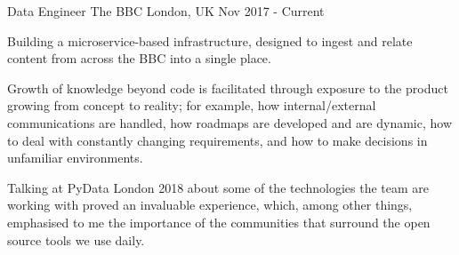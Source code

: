 \begin{cventries}
    \cventry
        {Data Engineer}
        {The BBC}
        {London, UK}
        {Nov 2017 - Current}
        {
            \begin{cvitems}
                \item{Building a microservice-based infrastructure, designed to ingest and relate content from across the BBC into a single place.}
                \item{Growth of knowledge beyond code is facilitated through exposure to the product growing from concept to reality; for example, how internal/external communications are handled, how roadmaps are developed and are dynamic, how to deal with constantly changing requirements, and how to make decisions in unfamiliar environments.}
                \item{Talking at PyData London 2018 about some of the technologies the team are working with proved an invaluable experience, which, among other things, emphasised to me the importance of the communities that surround the open source tools we use daily.}
            \end{cvitems}
        }
\end{cventries}